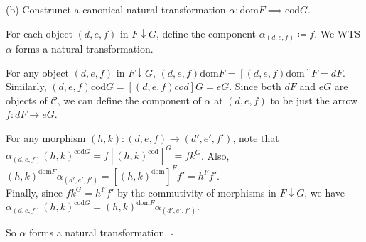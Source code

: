 \documentclass{article}
\begin{document}
(b) Construnct a canonical natural transformation $\alpha: \textrm{dom}F\implies \textrm{cod}G$.

For each object $(d,e,f)$ in $F \downarrow G$, define the component $\alpha_{(d,e,f)} \coloneqq f$. We WTS $\alpha$ forms a natural transformation. 

For any object $(d,e,f)$ in $F \downarrow G$, $(d,e,f)\textrm{dom}F = [(d,e,f){\textrm{dom}}]F = dF$. Similarly, $(d,e,f)\textrm{cod}G = [(d, e, f)cod]G = eG$. Since both $dF$ and $eG$ are objects of $\mathcal{C}$, we can define the component of $\alpha$ at $(d,e,f)$ to be just the arrow $f: dF \to eG$.

For any morphism $(h,k): (d,e,f) \to (d',e',f')$, note that $\alpha_{(d,e,f)}(h,k)^{\textrm{cod}G} = f[(h,k)^{\textrm{cod}}]^G = fk^G$. Also, $(h,k)^{\textrm{dom}F}\alpha_{(d',e',f')} = [(h,k)^{\textrm{dom}}]^Ff' = h^Ff'$. \\Finally, since $fk^G = h^Ff'$  by the commutivity of morphisms in $F \downarrow G$, we have $\alpha_{(d,e,f)}(h,k)^{\textrm{cod}G} = (h,k)^{\textrm{dom}F}\alpha_{(d',e',f')}$.

So $\alpha$ forms a natural transformation. $\square$
\end{document}
